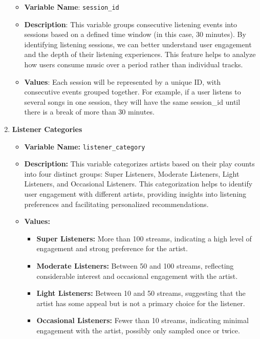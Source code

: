 \documentclass[
]{article}
\providecommand{\tightlist}{%
  \setlength{\itemsep}{0pt}\setlength{\parskip}{0pt}}
\begin{document}
\begin{enumerate}
  \begin{itemize}
  \tightlist
  \item
    \textbf{Variable Name}: \texttt{session\_id}
  \item
    \textbf{Description}: This variable groups consecutive listening
    events into sessions based on a defined time window (in this case,
    30 minutes). By identifying listening sessions, we can better
    understand user engagement and the depth of their listening
    experiences. This feature helps to analyze how users consume music
    over a period rather than individual tracks.
  \item
    \textbf{Values}: Each session will be represented by a unique ID,
    with consecutive events grouped together. For example, if a user
    listens to several songs in one session, they will have the same
    session\_id until there is a break of more than 30 minutes.
  \end{itemize}
\item
  \textbf{Listener Categories}

  \begin{itemize}
  \tightlist
  \item
    \textbf{Variable Name:} \texttt{listener\_category}
  \item
    \textbf{Description:} This variable categorizes artists based on
    their play counts into four distinct groups: Super Listeners,
    Moderate Listeners, Light Listeners, and Occasional Listeners. This
    categorization helps to identify user engagement with different
    artists, providing insights into listening preferences and
    facilitating personalized recommendations.
  \item
    \textbf{Values:}

    \begin{itemize}
    \tightlist
    \item
      \textbf{Super Listeners:} More than 100 streams, indicating a high
      level of engagement and strong preference for the artist.
    \item
      \textbf{Moderate Listeners:} Between 50 and 100 streams,
      reflecting considerable interest and occasional engagement with
      the artist.
    \item
      \textbf{Light Listeners:} Between 10 and 50 streams, suggesting
      that the artist has some appeal but is not a primary choice for
      the listener.
    \item
      \textbf{Occasional Listeners:} Fewer than 10 streams, indicating
      minimal engagement with the artist, possibly only sampled once or
      twice.
    \end{itemize}
  \end{itemize}
\end{enumerate}
\end{document}
